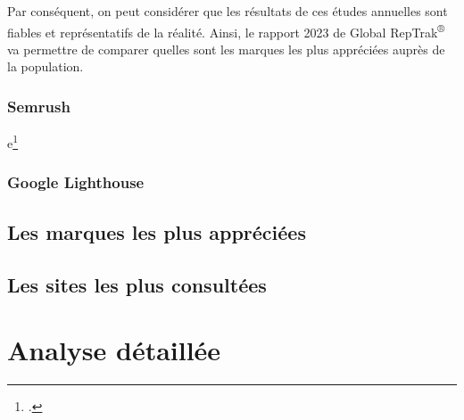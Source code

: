 \documentclass[12pt, a4paper]{report}
\begin{document}
Par conséquent, on peut considérer que les résultats de ces études annuelles sont fiables et représentatifs de la réalité. Ainsi, le rapport 2023 de Global RepTrak\textsuperscript{\tiny{®}} va permettre de comparer quelles sont les marques les plus appréciées auprès de la population.

\subsection{Semrush}

e\footcite{noauthor_most_nodate}


\subsection{Google Lighthouse}




\section{Les marques les plus appréciées}
\section{Les sites les plus consultées}


\chapter{Analyse détaillée}

\end{document}
